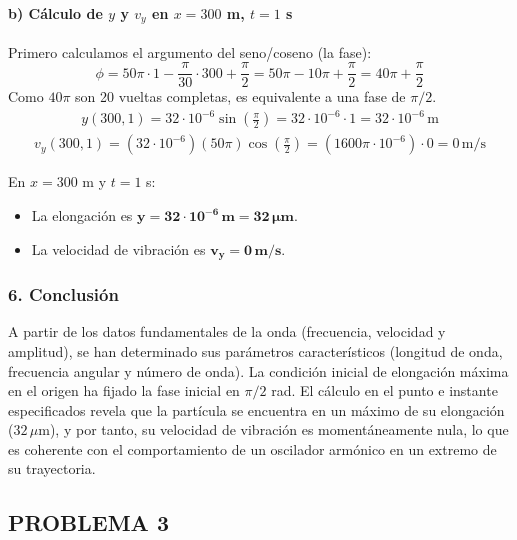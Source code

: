 \paragraph*{b) Cálculo de $y$ y $v_y$ en $x=300$ m, $t=1$ s}
Primero calculamos el argumento del seno/coseno (la fase):
$$ \phi = 50\pi \cdot 1 - \frac{\pi}{30} \cdot 300 + \frac{\pi}{2} = 50\pi - 10\pi + \frac{\pi}{2} = 40\pi + \frac{\pi}{2} $$
Como $40\pi$ son 20 vueltas completas, es equivalente a una fase de $\pi/2$.
\begin{gather}
    y(300,1) = 32 \cdot 10^{-6} \sin\left(\frac{\pi}{2}\right) = 32 \cdot 10^{-6} \cdot 1 = 32 \cdot 10^{-6} \, \text{m}
\end{gather}
\begin{gather}
    v_y(300,1) = (32 \cdot 10^{-6})(50\pi) \cos\left(\frac{\pi}{2}\right) = (1600\pi \cdot 10^{-6}) \cdot 0 = 0 \, \text{m/s}
\end{gather}
\begin{cajaresultado}
    En $x=300$ m y $t=1$ s:
    \begin{itemize}
        \item La elongación es $\boldsymbol{y = 32 \cdot 10^{-6} \, \textbf{m} = 32 \, \mu\textbf{m}}$.
        \item La velocidad de vibración es $\boldsymbol{v_y = 0 \, \textbf{m/s}}$.
    \end{itemize}
\end{cajaresultado}

\subsubsection*{6. Conclusión}
\begin{cajaconclusion}
A partir de los datos fundamentales de la onda (frecuencia, velocidad y amplitud), se han determinado sus parámetros característicos (longitud de onda, frecuencia angular y número de onda). La condición inicial de elongación máxima en el origen ha fijado la fase inicial en $\pi/2$ rad. El cálculo en el punto e instante especificados revela que la partícula se encuentra en un máximo de su elongación ($32 \, \mu\text{m}$), y por tanto, su velocidad de vibración es momentáneamente nula, lo que es coherente con el comportamiento de un oscilador armónico en un extremo de su trayectoria.
\end{cajaconclusion}

\newpage
\subsection{PROBLEMA 3}
\label{subsec:P3_2024_jun_ord}

